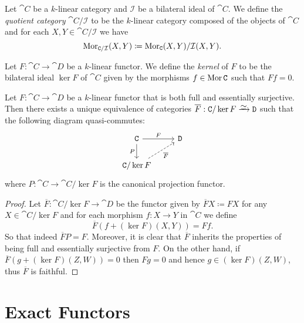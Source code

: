 \begin{definition}
\label{def:k-linear-cat-quotient-category}
Let \(\cat C\) be a \(k\)-linear category and \(\mathcal{I}\) be a bilateral ideal of
\(\cat C\). We define the \emph{quotient category} \(\cat C/\mathcal{I}\) to be the
\(k\)-linear category composed of the objects of \(\cat C\) and for each
\(X, Y \in \cat C/\mathcal{I}\) we have
\[
\operatorname{Mor}_{\texttt C/\mathcal{I}}(X, Y) \coloneq \operatorname{Mor}_{\texttt C}(X, Y)/\mathcal{I}(X, Y).
\]
\end{definition}

\begin{definition}
\label{def:k-linear-functor-kernel}
Let \(F: \cat C \to \cat D\) be a \(k\)-linear functor. We define the
\emph{kernel} of \(F\) to be the bilateral ideal \(\ker F\) of \(\cat C\) given
by the morphisms \(f \in \operatorname{Mor} \texttt C\) such that \(F f = 0\).
\end{definition}

\begin{proposition}
\label{prop:k-linear-functor-quotient-kernel-equivalence--cats}
Let \(F: \cat C \to \cat D\) be a \(k\)-linear functor that is both full and
essentially surjective. Then there exists a unique equivalence of categories
\(\overline F: \cat C/\ker F \isoto \cat D\) such that the following diagram
quasi-commutes:
\[
\begin{tikzcd}
\cat C \ar[d, "P"'] \ar[r, "F"]               &\cat D \\
\cat C/\ker F \ar[ru, "\overline F"', dashed] &
\end{tikzcd}
\]
where \(P: \cat C \to \cat C/\ker F\) is the canonical projection functor.
\end{proposition}

\begin{proof}
Let \(\overline F: \cat C/\ker F \to \cat D\) be the functor given by
\(\overline F X \coloneq F X\) for any \(X \in \cat C/\ker F\) and for each morphism
\(f: X \to Y\) in \(\cat C\) we define
\[
\overline F (f + (\ker F)(X, Y)) = F f.
\]
So that indeed \(\overline F P = F\). Moreover, it is clear that \(\overline F\)
inherits the properties of being full and essentially surjective from \(F\). On
the other hand, if \(\overline F (g + (\ker F)(Z, W)) = 0\) then \(F g = 0\) and
hence \(g \in (\ker F)(Z, W)\), thus \(\overline F\) is faithful.
\end{proof}

\section{Exact Functors}


